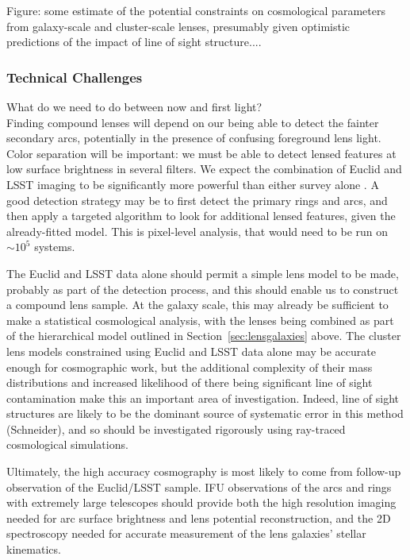 \documentclass[twocolumn]{svjour3}
\begin{document}
Figure: some estimate of the potential constraints on cosmological
parameters from galaxy-scale and cluster-scale lenses, presumably given
optimistic predictions of the impact of line of sight structure....


\subsubsection{Technical Challenges}

What do we need to do between now and first light?\\

Finding compound lenses will depend on our being able to detect the
fainter secondary arcs, potentially in the presence of confusing
foreground lens light. Color separation will be important: we must be
able to detect lensed features at low surface brightness in several
filters. We expect the combination of Euclid and LSST imaging to be
significantly more powerful than either survey alone \citep{JainEtal2015}. 
A good detection
strategy may be to first detect the primary rings and arcs, and then
apply a targeted algorithm to look for additional lensed features, given
the already-fitted model. This is pixel-level analysis, that would need
to be run on $\sim 10^5$ systems.

The Euclid and LSST data alone should permit a simple lens model to be
made, probably as part of the detection process, and this should enable
us to construct a compound lens sample. At the galaxy scale, this may
already be sufficient to make a statistical cosmological analysis, with
the lenses being combined as part of the hierarchical model outlined in
Section~\ref{sec:lensgalaxies} above. The cluster lens models
constrained using Euclid and LSST data alone may be accurate enough for
cosmographic work, but the additional complexity of their mass
distributions and increased likelihood of there being significant line
of sight contamination make this an important area of investigation.
Indeed, line of sight structures are likely to be the dominant source of
systematic error in this method (Schneider), and so should be
investigated rigorously using ray-traced cosmological simulations.

Ultimately, the high accuracy cosmography is most likely to come from
follow-up observation of the Euclid/LSST sample. IFU observations of the
arcs and rings with extremely large telescopes should provide both the
high resolution imaging needed for arc surface brightness and lens
potential reconstruction, and the 2D spectroscopy needed for accurate
measurement of the lens galaxies' stellar kinematics.\\
\end{document}
